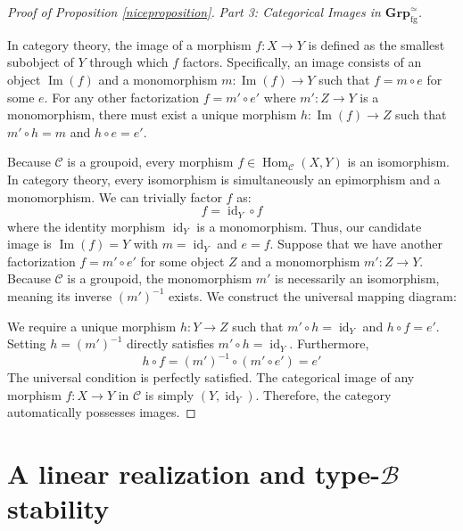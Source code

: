\documentclass{amsart}
\begin{document}
\begin{proof}[Proof of Proposition \ref{niceproposition}]
\textit{Part 3: Categorical Images in $\mathbf{Grp}_{\mathrm{fg}}^{\simeq}$.}

\medskip

In category theory, the image of a morphism $f: X \to Y$ is defined as the smallest subobject of $Y$ through which $f$ factors. Specifically, an image consists of an object $\operatorname{Im}(f)$ and a monomorphism $m: \operatorname{Im}(f) \to Y$ such that $f = m \circ e$ for some $e$. For any other factorization $f = m' \circ e'$ where $m': Z \to Y$ is a monomorphism, there must exist a unique morphism $h: \operatorname{Im}(f) \to Z$ such that $m' \circ h = m$ and $h \circ e = e'$.

Because $\mathcal{C}$ is a groupoid, every morphism $f \in \operatorname{Hom}_\mathcal{C}(X, Y)$ is an isomorphism. In category theory, every isomorphism is simultaneously an epimorphism and a monomorphism. We can trivially factor $f$ as:
\[    f = \operatorname{id}_Y \circ f \]
where the identity morphism $\operatorname{id}_Y$ is a monomorphism. Thus, our candidate image is $\operatorname{Im}(f) = Y$ with $m = \operatorname{id}_Y$ and $e = f$. Suppose that we have another factorization $f = m' \circ e'$ for some object $Z$ and a monomorphism $m': Z \to Y$. Because $\mathcal{C}$ is a groupoid, the monomorphism $m'$ is necessarily an isomorphism, meaning its inverse $(m')^{-1}$ exists. We construct the universal mapping diagram:

\begin{center}
\end{center}

We require a unique morphism $h: Y \to Z$ such that $m' \circ h = \operatorname{id}_Y$ and $h \circ f = e'$. Setting $h = (m')^{-1}$ directly satisfies $m' \circ h = \operatorname{id}_Y$. Furthermore, 
\[
    h \circ f = (m')^{-1} \circ (m' \circ e') = e'
\]
The universal condition is perfectly satisfied. The categorical image of any morphism $f: X \to Y$ in $\mathcal{C}$ is simply $(Y, \operatorname{id}_Y)$. Therefore, the category automatically possesses images.
\end{proof}



\section{A linear realization and type-\texorpdfstring{$\mathcal B$}{B} stability}
\label{sec:linearization}
\end{document}
